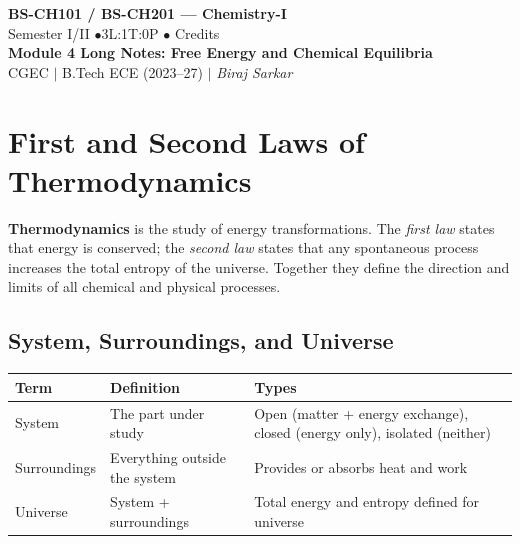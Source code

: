 \documentclass[12pt,a4paper]{article}
\begin{document}
\begin{center}
  {\LARGE\bfseries\color{myred} BS-CH101 / BS-CH201 --- Chemistry-I}\\[5pt]
  {\normalsize\color{mydark} Semester I/II \quad$\bullet$\quad 3L:1T:0P \quad$\bullet$ Credits}\\[3pt]
  {\normalsize\color{myteal}\textbf{Module 4 Long Notes: Free Energy and Chemical Equilibria}}\\[3pt]
  {\small\color{mydark} CGEC \;$|$\; B.Tech ECE (2023--27) \;$|$\; \textit{Biraj Sarkar}}
\end{center}
\vspace{2pt}
\noindent{\color{myred}\rule{\linewidth}{1.5pt}}
\vspace{2pt}
\hypersetup{linkcolor=mydark}
\tableofcontents
\hypersetup{linkcolor=myteal}
\newpage
\section{First and Second Laws of Thermodynamics}

\begin{tcolorbox}[defbox]
\textbf{Thermodynamics} is the study of energy transformations. The \emph{first law} states that energy is conserved; the \emph{second law} states that any spontaneous process increases the total entropy of the universe. Together they define the direction and limits of all chemical and physical processes.
\end{tcolorbox}

\subsection{System, Surroundings, and Universe}
\begin{tabularx}{\linewidth}{|B{2.4cm}|Y|Y|}
\hline
\textbf{Term} & \textbf{Definition} & \textbf{Types} \\
\hline
System & The part under study & Open (matter + energy exchange), closed (energy only), isolated (neither) \\
\hline
Surroundings & Everything outside the system & Provides or absorbs heat and work \\
\hline
Universe & System + surroundings & Total energy and entropy defined for universe \\
\hline
\end{tabularx}
\end{document}
